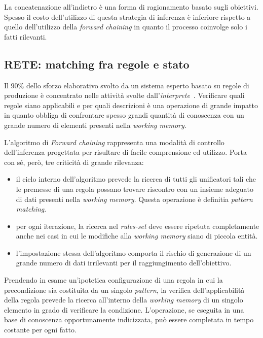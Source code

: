 La concatenazione all'indietro è una forma di ragionamento basato sugli obiettivi. Spesso il costo dell'utilizzo di questa strategia di inferenza è inferiore rispetto a quello dell'utilizzo della \emph{forward chaining} in quanto il processo coinvolge solo i fatti rilevanti.~\cite{russellnorvig2009}

\subsection{RETE: matching fra regole e stato}

Il $90\%$ dello sforzo elaborativo svolto da un sistema esperto basato su regole di produzione è concentrato nelle attività svolte dall'\emph{interprete}~\cite{forgy1982}. Verificare quali regole siano applicabili e per quali descrizioni è una operazione di grande impatto in quanto obbliga di confrontare spesso grandi quantità di conoscenza con un grande numero di elementi presenti nella \emph{working memory}.

L'algoritmo di \emph{Forward chaining} rappresenta una modalità di controllo dell'inferenza progettata per risultare di facile comprensione ed utilizzo. Porta con sé, però, tre criticità di grande rilevanza: \cite{russellnorvig2009}
\begin{itemize}
	\item il ciclo interno dell'algoritmo prevede la ricerca di tutti gli unificatori tali che le premesse di una regola possano trovare riscontro con un insieme adeguato di dati presenti nella \emph{working memory}. Questa operazione è definitia \emph{pattern matching}.
	\item per ogni iterazione, la ricerca nel \emph{rules-set} deve essere ripetuta completamente anche nei casi in cui le modifiche alla \emph{working memory} siano di piccola entità.
	\item l'impostazione stessa dell'algoritmo comporta il rischio di generazione di un grande numero di dati irrilevanti per il raggiungimento dell'obiettivo.
\end{itemize}

Prendendo in esame un'ipotetica configurazione di una regola in cui la precondizione sia costituita da un singolo \emph{pattern}, la verifica dell'applicabilità della regola prevede la ricerca all'interno della \emph{working memory} di un singolo elemento in grado di verificare la condizione. L'operazione, se eseguita in una base di conoscenza opportunamente indicizzata, può essere completata in tempo costante per ogni fatto.~\cite{russellnorvig2009}


